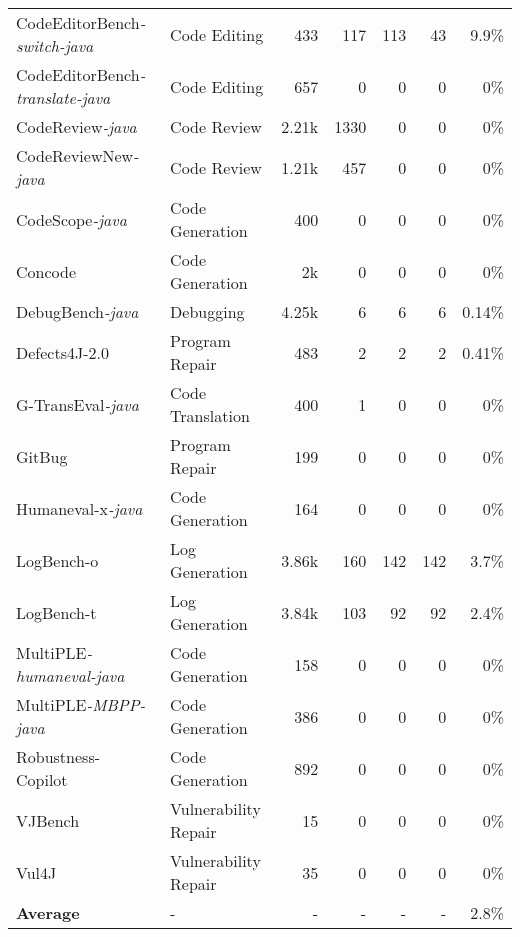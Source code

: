 \begin{table}[t]
{{\begin{tabular}{llrrrrr}
CodeEditorBench\textit{-switch-java}~\cite{CodeEditorBench} & Code Editing & 433 & 117 & 113 & 43 & \cellcolor{red!20} 9.9\% \\
CodeEditorBench\textit{-translate-java}~\cite{CodeEditorBench}  & Code Editing & 657 & 0 & 0 & 0 & 0\% \\
CodeReview\textit{-java}~\cite{CodeReview} & Code Review & 2.21k & 1330 & 0 & 0 & 0\% \\
CodeReviewNew\textit{-java}~\cite{CodeReviewNew}  & Code Review & 1.21k & 457 & 0 & 0 & 0\% \\
CodeScope\textit{-java}~\cite{Codescope} & Code Generation & 400 & 0 & 0 & 0 & 0\% \\
Concode~\cite{Concode} & Code Generation & 2k & 0 & 0 & 0 & 0\% \\
DebugBench\textit{-java}~\cite{DebugBench} & Debugging & 4.25k & 6 & 6 & 6 & \cellcolor{red!0.28} 0.14\% \\
Defects4J-2.0~\cite{Defects4J} & Program Repair & 483 & 2 & 2 & 2 & \cellcolor{red!0.82} 0.41\% \\
G-TransEval\textit{-java}~\cite{G-TransEval} & Code Translation & 400 & 1 & 0 & 0 & 0\% \\
GitBug~\cite{GitBug} & Program Repair & 199 & 0 & 0 & 0 & 0\% \\
Humaneval-x\textit{-java}~\cite{zheng2023codegeex} & Code Generation & 164 & 0 & 0 & 0 & 0\% \\
LogBench-o~\cite{LogBench} & Log Generation & 3.86k & 160 & 142 & 142 & \cellcolor{red!7.4} 3.7\% \\
LogBench-t~\cite{LogBench} & Log Generation & 3.84k & 103 & 92 & 92 & \cellcolor{red!4.8} 2.4\% \\
MultiPLE\textit{-humaneval-java}~\cite{MultiPLE}   & Code Generation & 158 & 0 & 0 & 0 & 0\% \\
MultiPLE\textit{-MBPP-java}~\cite{MultiPLE} & Code Generation & 386 & 0 & 0 & 0 & 0\% \\
Robustness-Copilot~\cite{Robustness-Copilot} & Code Generation & 892 & 0 & 0 & 0 & 0\% \\
VJBench~\cite{VJBench} & Vulnerability Repair & 15 & 0 & 0 & 0 & 0\% \\
Vul4J~\cite{Vul4J} & Vulnerability Repair & 35 & 0 & 0 & 0 & 0\% \\ \hline
\textbf{Average} & - & - & - & - & - & 2.8\% \\
\bottomrule
\end{tabular}
}} \vspace{-0.4cm}
\end{table}